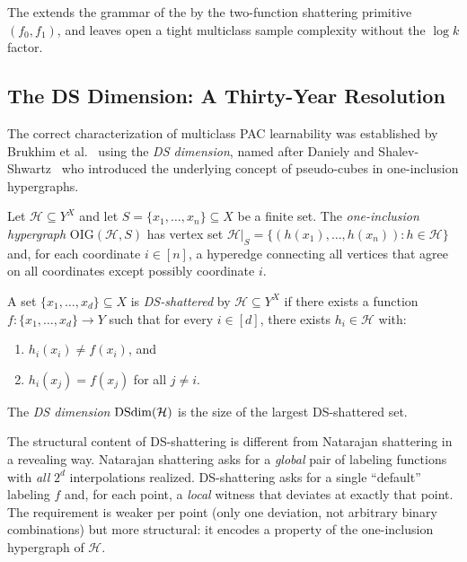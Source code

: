 The  extends the grammar of the  by
the two-function shattering primitive $(f_0, f_1)$, and leaves open a tight
multiclass sample complexity without the $\log k$ factor.


\subsection{The DS Dimension: A Thirty-Year Resolution}
\label{subsec:ds-dim}

The correct characterization of multiclass PAC learnability was established
by Brukhim et al.~\cite{BrukhimCarmonDinurMoranYehudayoff2022} using the
\emph{DS dimension}, named after Daniely and
Shalev-Shwartz~\cite{DanielyShalevShwartz2014} who introduced the
underlying concept of pseudo-cubes in one-inclusion hypergraphs.

\begin{defn}
\label{def:oig}
Let $\mathcal{H} \subseteq Y^X$ and let $S = \{x_1, \ldots, x_n\} \subseteq X$
be a finite set.  The \emph{one-inclusion hypergraph} $\mathrm{OIG}(\mathcal{H}, S)$
has vertex set $\mathcal{H}|_S = \{(h(x_1), \ldots, h(x_n)) : h \in \mathcal{H}\}$
and, for each coordinate $i \in [n]$, a hyperedge connecting all vertices that
agree on all coordinates except possibly coordinate $i$.
\end{defn}

\begin{defn}
\label{def:ds-dim-ext}
A set $\{x_1, \ldots, x_d\} \subseteq X$ is \emph{DS-shattered} by
$\mathcal{H} \subseteq Y^X$ if there exists a function
$f \colon \{x_1, \ldots, x_d\} \to Y$ such that for every $i \in [d]$,
there exists $h_i \in \mathcal{H}$ with:
\begin{enumerate}[leftmargin=*,nosep]
\item $h_i(x_i) \neq f(x_i)$, and
\item $h_i(x_j) = f(x_j)$ for all $j \neq i$.
\end{enumerate}
The \emph{DS dimension} $\mathrm{DSdim}(\mathcal{H})$ is the size of the largest
DS-shattered set.
\end{defn}

The structural content of DS-shattering is different from Natarajan shattering
in a revealing way.  Natarajan shattering asks for a \emph{global} pair of
labeling functions with \emph{all} $2^d$ interpolations realized.
DS-shattering asks for a single ``default'' labeling $f$ and, for each
point, a \emph{local} witness that deviates at exactly that point.  The
requirement is weaker per point (only one deviation, not arbitrary binary
combinations) but more structural: it encodes a property of the
one-inclusion hypergraph of $\mathcal{H}$.


